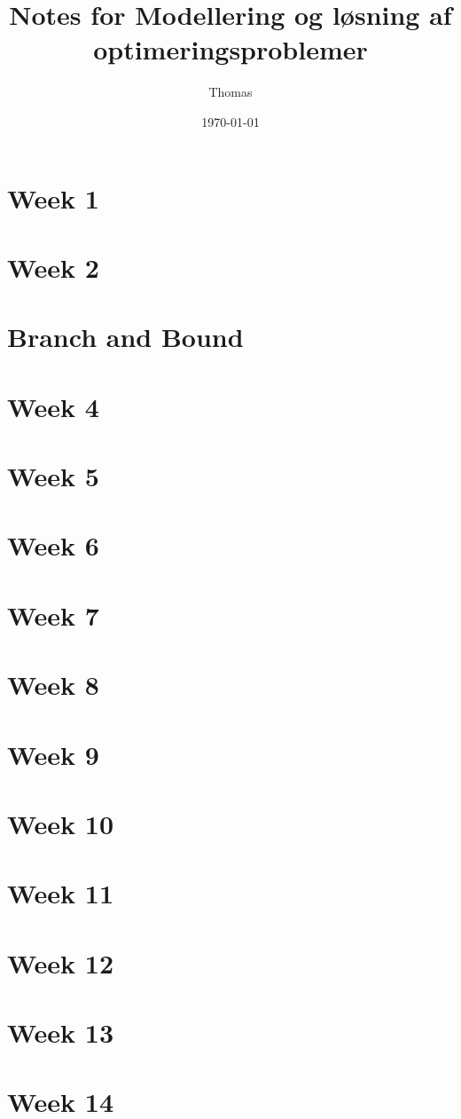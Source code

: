 \documentclass[a4paper,12pt]{article}
\title{Notes for Modellering og løsning af optimeringsproblemer}
\author{Thomas}
\date{\today}
\begin{document}
\maketitle
\tableofcontents
\newpage

\section{Week 1}


\section{Week 2}


\section{Branch and Bound}




\section{Week 4}
%

\section{Week 5}
%

\section{Week 6}
%

\section{Week 7}
%

\section{Week 8}
%

\section{Week 9}
%

\section{Week 10}
%

\section{Week 11}
%

\section{Week 12}
%

\section{Week 13}
%

\section{Week 14}
%
\end{document}

